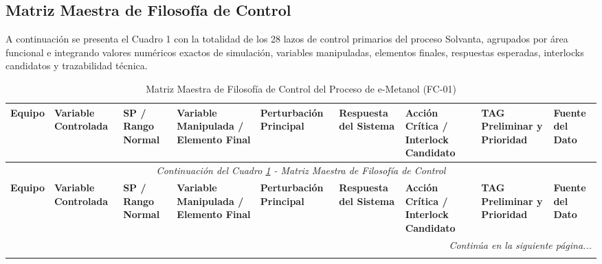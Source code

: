 \documentclass[10pt,letterpaper]{article}
\begin{document}
\newpage
\begin{landscape}
\section{Matriz Maestra de Filosofía de Control}
A continuación se presenta el Cuadro 1 con la totalidad de los 28 lazos de control primarios del proceso Solvanta, agrupados por área funcional e integrando valores numéricos exactos de simulación, variables manipuladas, elementos finales, respuestas esperadas, interlocks candidatos y trazabilidad técnica.

\vspace{0.2cm}
\footnotesize
\setlength{\tabcolsep}{2.8pt}
\begin{longtable}{|p{1.4cm}|p{2.3cm}|p{2.0cm}|p{2.9cm}|p{2.8cm}|p{3.0cm}|p{3.4cm}|p{2.5cm}|p{1.5cm}|}
\caption{Matriz Maestra de Filosofía de Control del Proceso de e-Metanol (FC-01)} \label{tab:matriz_maestra} \\
\hline
\rowcolor{tableheader}
\color{white}\textbf{Equipo} & 
\color{white}\textbf{Variable Controlada} & 
\color{white}\textbf{SP / Rango Normal} & 
\color{white}\textbf{Variable Manipulada / Elemento Final} & 
\color{white}\textbf{Perturbación Principal} & 
\color{white}\textbf{Respuesta del Sistema} & 
\color{white}\textbf{Acción Crítica / Interlock Candidato} & 
\color{white}\textbf{TAG Preliminar y Prioridad} & 
\color{white}\textbf{Fuente del Dato} \\
\hline
\endfirsthead
\multicolumn{9}{c}{\footnotesize\textit{Continuación del Cuadro \ref{tab:matriz_maestra} - Matriz Maestra de Filosofía de Control}} \\
\hline
\rowcolor{tableheader}
\color{white}\textbf{Equipo} & 
\color{white}\textbf{Variable Controlada} & 
\color{white}\textbf{SP / Rango Normal} & 
\color{white}\textbf{Variable Manipulada / Elemento Final} & 
\color{white}\textbf{Perturbación Principal} & 
\color{white}\textbf{Respuesta del Sistema} & 
\color{white}\textbf{Acción Crítica / Interlock Candidato} & 
\color{white}\textbf{TAG Preliminar y Prioridad} & 
\color{white}\textbf{Fuente del Dato} \\
\hline
\endhead
\hline
\multicolumn{9}{r}{\footnotesize\textit{Continúa en la siguiente página...}} \\
\endfoot
\hline
\endlastfoot


\end{longtable}
\end{landscape}
\end{document}
